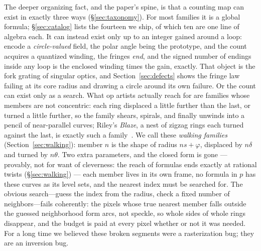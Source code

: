 The deeper organizing fact, and the paper's spine, is that a counting map can
exist in exactly three ways (\S\ref{sec:taxonomy}). For most families it is a
global formula; \S\ref{sec:catalog} lists the fourteen we ship, of which ten
are one line of algebra each. It can instead exist only up to an integer
gained around a loop: encode a \emph{circle-valued} field, the polar angle
being the prototype, and the count acquires a quantized winding, the fringes
\emph{end}, and the signed number of endings inside any loop is the enclosed
winding times the gain, exactly. That object is the fork grating of singular
optics, and Section~\ref{sec:defects} shows the fringe law failing at its core
radius and drawing a circle around its own failure. Or the count can exist
only as a search. What op
artists actually reach for are families whose members are not concentric:
each ring displaced a little further than the last, or turned a little further,
so the family shears, spirals, and finally unwinds into a pencil of
near-parallel curves; Riley's \emph{Blaze}, a nest of zigzag rings each turned
against the last, is exactly such a family~\cite{Oster1965Optical}. We call
these \emph{walking families} (Section~\ref{sec:walking}): member $n$ is the
shape of radius $ns+\varphi$, displaced by $n\delta$ and turned by $n\theta$.
Two extra parameters, and the closed form is gone --- provably, not for want
of cleverness: the reach of formulas ends exactly at rational twists
(\S\ref{sec:walking}) --- each member lives in its own frame, no formula in
$p$ has these curves as its level sets, and the nearest index must be
searched for. The obvious search---guess the index from the
radius, check a fixed number of neighbors---fails coherently: the pixels
whose true nearest member falls outside the guessed neighborhood form arcs,
not speckle, so whole sides of whole rings disappear, and the budget is paid at
every pixel whether or not it was needed. For a long time we believed these
broken segments were a rasterization bug; they are an inversion bug.

